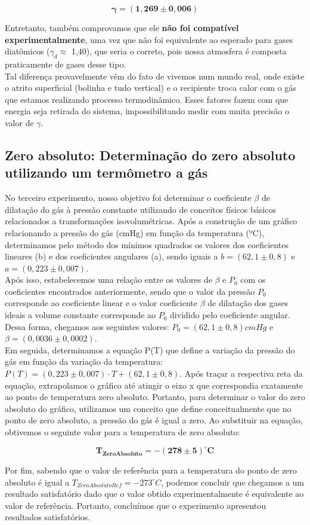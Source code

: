 \[ \mathbf{\gamma = (1,269 \pm 0,006)} \]

Entretanto, também comprovamos que ele \textbf{não foi compatível experimentalmente}, uma vez que não foi equivalente ao esperado para gases diatômicos ($\gamma_d \approx$ 1,40), que seria o correto, pois nossa atmosfera é composta praticamente de gases desse tipo.\\

Tal diferença provavelmente vêm do fato de vivemos num mundo real, onde existe o atrito superficial (bolinha e tudo vertical) e o recipiente troca calor com o gás que estamos realizando processo termodinâmico. Esses fatores fazem com que energia seja retirada do sistema, impossibilitando medir com muita precisão o valor de $\gamma$.


\subsection{Zero absoluto: Determinação do zero absoluto utilizando um termômetro a
gás}

No terceiro experimento, nosso objetivo foi determinar o coeficiente $\beta$ de dilatação do gás à pressão constante utilizando de conceitos físicos básicos relacionados a transformações isovolumétricas. Após a construção de um gráfico relacionando a pressão do gás (cmHg) em função da temperatura (ºC), determinamos pelo método dos mínimos quadrados os valores dos coeficientes lineares (b) e dos coeficientes angulares (a), sendo iguais a $b = (62,1 \pm 0,8)$ e $a = (0,223 \pm 0,007)$.\\

Após isso, estabelecemos uma relação entre os valores de $\beta$ e $P_0$ com os coeficientes encontrados anteriormente, sendo que o valor da pressão $P_0$ corresponde ao coeficiente linear e o valor coeficiente $\beta$ de dilatação dos gases ideais a volume constante corresponde ao $P_0$ dividido pelo coeficiente angular. Dessa forma, chegamos aos seguintes valores: $P_0 = (62,1 \pm 0,8) cmHg$ e $\beta = (0,0036 \pm 0,0002)$.\\

Em seguida, determinamos a equação P(T) que define a variação da pressão do gás em função da variação da temperatura: $P(T) = (0,223 \pm 0,007) \cdot T + (62,1 \pm 0,8)$. Após traçar a respectiva reta da equação, extrapolamos o gráfico até atingir o eixo x que correspondia exatamente ao ponto de temperatura zero absoluto. Portanto, para determinar o valor do zero absoluto do gráfico, utilizamos um conceito que define conceitualmente que no ponto de zero absoluto, a pressão do gás é igual a zero. Ao substituir na equação, obtivemos o seguinte valor para a temperatura de zero absoluto:

\[ \mathbf{T_{Zero Absoluto}= -(278 \pm 5) ^\circ C} \]

Por fim, sabendo que o valor de referência para a temperatura do ponto de zero absoluto é igual a $T_{Zero Absoluto Ref}= -273 ^\circ C$, podemos concluir que chegamos a um resultado satisfatório dado que o valor obtido experimentalmente é equivalente ao valor de referência. Portanto, concluímos que o experimento apresentou resultados satisfatórios.
